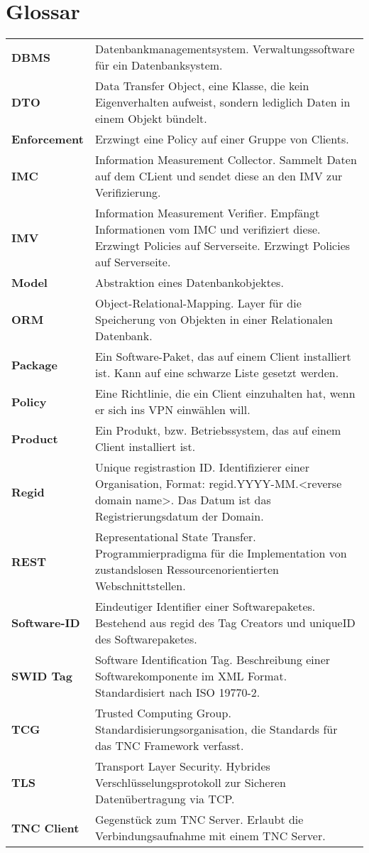 \chapter{Glossar}

{
\renewcommand{\arraystretch}{1.5}
\begin{longtable}{l >{\raggedright}p{}}
\textbf{DBMS} & Datenbankmanagementsystem. Verwaltungssoftware für ein Datenbanksystem.\tabularnewline
\textbf{DTO} & Data Transfer Object, eine Klasse, die kein Eigenverhalten aufweist, sondern lediglich Daten in einem Objekt bündelt.\tabularnewline
\textbf{Enforcement} & Erzwingt eine Policy auf einer Gruppe von Clients.\tabularnewline
\textbf{IMC} & Information Measurement Collector. Sammelt Daten auf dem CLient und sendet diese an den IMV zur Verifizierung.\tabularnewline
\textbf{IMV} & Information Measurement Verifier. Empfängt Informationen vom IMC und verifiziert diese. Erzwingt Policies auf Serverseite. Erzwingt Policies auf Serverseite.\tabularnewline
\textbf{Model} & Abstraktion eines Datenbankobjektes.\tabularnewline
\textbf{ORM} & Object-Relational-Mapping. Layer für die Speicherung von Objekten in einer Relationalen Datenbank.\tabularnewline
\textbf{Package} & Ein Software-Paket, das auf einem Client installiert ist. Kann auf eine schwarze Liste gesetzt werden.\tabularnewline
\textbf{Policy} & Eine Richtlinie, die ein Client einzuhalten hat, wenn er sich ins VPN einwählen will.\tabularnewline
\textbf{Product} & Ein Produkt, bzw. Betriebssystem, das auf einem Client installiert ist.\tabularnewline
\textbf{Regid} & Unique registrastion ID. Identifizierer einer Organisation, Format: regid.YYYY-MM.<reverse domain name>. Das Datum ist das Registrierungsdatum der Domain.\tabularnewline
\textbf{REST} & Representational State Transfer. Programmierpradigma für die Implementation von zustandslosen Ressourcenorientierten Webschnittstellen.\tabularnewline
\textbf{Software-ID} & Eindeutiger Identifier einer Softwarepaketes. Bestehend aus regid des Tag Creators und uniqueID des Softwarepaketes.\tabularnewline
\textbf{SWID Tag} & Software Identification Tag. Beschreibung einer Softwarekomponente im XML Format. Standardisiert nach ISO 19770-2.\tabularnewline
\textbf{TCG} & Trusted Computing Group. Standardisierungsorganisation, die Standards für das TNC Framework verfasst.\tabularnewline
\textbf{TLS} & Transport Layer Security. Hybrides Verschlüsselungsprotokoll zur Sicheren Datenübertragung via TCP.\tabularnewline
\textbf{TNC Client} & Gegenstück zum TNC Server. Erlaubt die Verbindungsaufnahme mit einem TNC Server.\tabularnewline

\end{longtable}}
